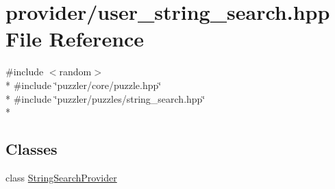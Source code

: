 \hypertarget{a00139}{}\section{provider/user\+\_\+string\+\_\+search.hpp File Reference}
\label{a00139}
{\ttfamily \#include $<$random$>$}\\*
{\ttfamily \#include \char`\"{}puzzler/core/puzzle.\+hpp\char`\"{}}\\*
{\ttfamily \#include \char`\"{}puzzler/puzzles/string\+\_\+search.\+hpp\char`\"{}}\\*
\subsection*{Classes}
\begin{DoxyCompactItemize}
\item 
class \hyperlink{a00034}{String\+Search\+Provider}
\end{DoxyCompactItemize}
